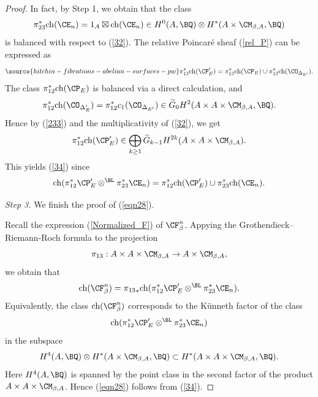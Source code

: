 \begin{proof}
In fact, by Step 1, we obtain that the class
\[
\pi_{23}^* \mathrm{ch}(\CE_n) = 1_A \boxtimes \mathrm{ch}(\CE_n) \in H^0(A, \BQ) \otimes H^*(A\times \CM_{\beta,A}, \BQ)
\]
is balanced with respect to (\ref{32}). The relative Poincar\'e sheaf (\ref{rel_P}) can be expressed as
\begin{equation}\label{233}
\source{hitchin-fibrations-abelian-surfaces-pw}
\pi_{13}^\ast \mathrm{ch}(\CP'_E) = \pi_{13}^\ast \mathrm{ch}(\CP_E)\cup \pi_{13}^* \mathrm{ch}(\CO_{\Delta_{E'}}).
\end{equation}
The class $\pi_{12}^\ast \mathrm{ch}(\CP_E)$ is balanced via a direct calculation, and
\[
\pi_{12}^*\mathrm{ch}(\CO_{\Delta_E'}) = \pi_{12}^* c_1(\CO_{\Delta_{E'}}) \in \widetilde{G}_0 H^2(A\times A \times \CM_{\beta,A}, \BQ).
\]
Hence by (\ref{233}) and the multiplicativity of (\ref{32}), we get
\[
\pi_{12}^* \mathrm{ch}(\CP'_E)\in \bigoplus_{k\geq 1} \widetilde{G}_{k-1}H^{2k}(A\times A \times \CM_{\beta,A}).
\]
This yields (\ref{34}) since
\[
\mathrm{ch}(\pi_{12}^\ast {\CP'_{E}} \otimes^{\BL} \pi_{23}^\ast \CE_n) = \pi_{12}^*\mathrm{ch}(\CP'_E) \cup \pi_{23}^\ast \mathrm{ch}(\CE_n).
\]

 \emph{Step 3.} We finish the proof of (\ref{eqn28}).

Recall the expression (\ref{Normalized_F}) of $\CF^n_\beta$. Appying the Grothendieck--Riemann-Roch formula to the projection
\[
\pi_{13}: A \times A \times \CM_{\beta, A} \to A \times \CM_{\beta,A},
\]
we obtain that
\[
\mathrm{ch}(\CF^n_\beta) = {\pi_{13}}_\ast \mathrm{ch}(\pi_{12}^\ast {\CP'_{E}} \otimes^{\BL} \pi_{23}^\ast \CE_n).
\]
Equivalently, the class $\mathrm{ch}(\CF^n_\beta)$ corresponds to the K\"unneth factor of the class
\[
\mathrm{ch}(\pi_{12}^\ast {\CP'_{E}} \otimes^{\BL} \pi_{23}^\ast \CE_n)
\]
in the subspace
\[
H^4(A, \BQ) \otimes H^*(A \times \CM_{\beta,A}, \BQ) \subset H^*(A\times A \times \CM_{\beta, A}, \BQ).
\]
Here $H^4(A, \BQ)$ is spanned by the point class in the second factor of the product $A \times A \times \CM_{\beta, A}$. Hence (\ref{eqn28}) follows from (\ref{34}).
\end{proof}


